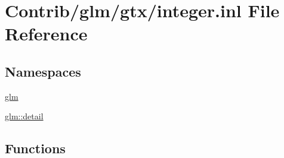 \hypertarget{gtx_2integer_8inl}{}\section{Contrib/glm/gtx/integer.inl File Reference}
\label{gtx_2integer_8inl}
\subsection*{Namespaces}
\begin{DoxyCompactItemize}
\item 
 \mbox{\hyperlink{namespaceglm}{glm}}
\item 
 \mbox{\hyperlink{namespaceglm_1_1detail}{glm\+::detail}}
\end{DoxyCompactItemize}
\subsection*{Functions}

